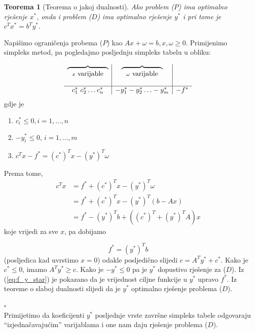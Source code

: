 \documentclass[a4paper, utf8, 11pt, colorlinks]{book}
\newtheorem{thm}{Teorema}
\newenvironment{proof}{{Dokaz:}}{\hfill$\square$}
\begin{document}
\begin{thm}[Teorema o jakoj dualnosti]
     Ako problem ($P$) ima optimalno rješenje $x^*$, onda i problem ($D$) ima optimalno rješenje $y^*$ i pri tome je $c^T x^* = b^T y^*$.
\end{thm}
\begin{proof}
         Napišimo ograničenja probema ($P$) kao $Ax + \omega = b, x, \omega \geq 0$.
         Primijenimo simpleks metod, pa pogledajmo posljednju simpleks tabelu u obliku:
         
         $$\begin{array}{c |c | c}
         \overbrace{\ \ \ \ \ \hspace{1.5cm}}_{x \mbox{ varijable}}     &  \overbrace{\ \ \ \ \ \hspace{1.5cm}}_{\omega \mbox{ varijable}} &   \\
                                                           & &   \\
         \hline
             c_1^*\ c_2^* \ldots c_n^*            & -y_1^* -y_2^* \ldots -y_m^*  & -f^*
         \end{array}
         $$
   gdje je 
   \begin{enumerate}
       \item    $c^*_i \leq 0, i = 1,\ldots, n$ 
       \item    $-y_i^* \leq 0$, $i = 1,\ldots, m$
       \item  $c^T x - f^* = (c^*)^T x - (y^*)^T \omega$
    \end{enumerate}
    Prema tome, 
    \begin{align*}
           c^T x &=  f^* + (c^*)^T x - (y^*)^T \omega \\
                 &=  f^* + (c^*)^T x - (y^*)^T (b - Ax) \\
                 &= f^*  - (y^*)^T b +   ((c^*)^T + (y^*)^T A ) x
    \end{align*}
    koje vrijedi za sve $x$, pa dobijamo 
    
    \begin{equation}\label{eq:f_y_star}
        f^* = (y^*)^T b
    \end{equation}
     (posljedica kad uvrstimo $x = 0$) odakle posljedično slijedi 
    $ c = A^T y^* + c^*$. 
    Kako je $c^* \leq 0$, imamo  $A^T y^* \geq c$. Kako je $-y^* \leq 0$ pa je $y^*$ dopustivo rješenje za  ($D$).  Iz (\ref{eq:f_y_star}) je pokazano da je vrijednost ciljne funkcije u $y^*$ upravo $f^*$. Iz teoreme o slaboj dualnosti slijedi da je $y^*$ optimalno rješenje problema  ($D$). 
    
\end{proof} \\
Primijetimo da koeficijenti $y^*$ posljednje vrste završne simpleks tabele odgovaraju  ``izjednačavajućim''   varijablama i one nam daju rješenje problema  ($D$).  
\end{document}
